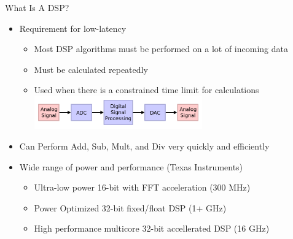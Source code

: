 \documentclass{beamer}
\begin{document}
\begin{frame}{What Is A DSP?}
    \begin{itemize}
        \item Requirement for low-latency
            \begin{itemize}
                \item Most DSP algorithms must be performed on a lot of incoming data
                \item Must be calculated repeatedly
                \item Used when there is a constrained time limit for calculations
                    \includegraphics[width=0.6\textwidth]{block_diagram.png}
            \end{itemize}
        \item Can Perform Add, Sub, Mult, and Div very quickly and efficiently
	\item Wide range of power and performance (Texas Instruments)
	     \begin{itemize}
                \item Ultra-low power 16-bit with FFT acceleration (300 MHz)
                \item Power Optimized 32-bit fixed/float DSP (1+ GHz)
                \item High performance multicore 32-bit accellerated DSP (16 GHz)
            \end{itemize}
     \end{itemize}
\end{frame}
\end{document}
